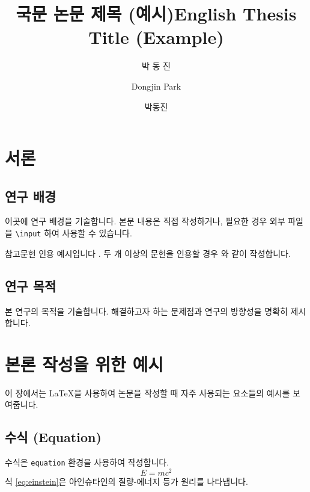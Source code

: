 \documentclass[master, korean]{pnuthesis}
\title[korean]{국문 논문 제목 (예시)}
\title[english]{English Thesis Title (Example)}
\author[korean]{박 동 진}
\author[english]{Dongjin Park}
\author[nospace]{박동진}
\begin{document}
\renewcommand{\baselinestretch}{1.5}    %
\selectfont                             %

\changepage{5mm}{}{}{}{}{}{}{}{-5mm}    %

\makelists %



\newcommand{\IntegratedView}{통합 뷰}
\newcommand{\Registration}{정합}
\newcommand{\ProcessingNode}{처리 노드}
\newcommand{\UAVfull}{무인항공기 (Unmanned Aerial Vehicle, UAV; 이하 ‘드론’)}
\newcommand{\UAV}{드론}

\chapter{서론}
\section{연구 배경}
이곳에 연구 배경을 기술합니다. 본문 내용은 직접 작성하거나, 필요한 경우 외부 파일을 \texttt{\textbackslash input} 하여 사용할 수 있습니다.

참고문헌 인용 예시입니다 \cite{motlagh2023unmanned}. 두 개 이상의 문헌을 인용할 경우 \cite{motlagh2023unmanned, chen2022wildland}와 같이 작성합니다.

\section{연구 목적}
본 연구의 목적을 기술합니다. 해결하고자 하는 문제점과 연구의 방향성을 명확히 제시합니다.

\chapter{본론 작성을 위한 예시}
이 장에서는 \LaTeX 을 사용하여 논문을 작성할 때 자주 사용되는 요소들의 예시를 보여줍니다.

\section{수식 (Equation)}
수식은 \texttt{equation} 환경을 사용하여 작성합니다.
\begin{equation}
    E = mc^2 \label{eq:einstein}
\end{equation}
식 \ref{eq:einstein}은 아인슈타인의 질량-에너지 등가 원리를 나타냅니다.
\end{document}
